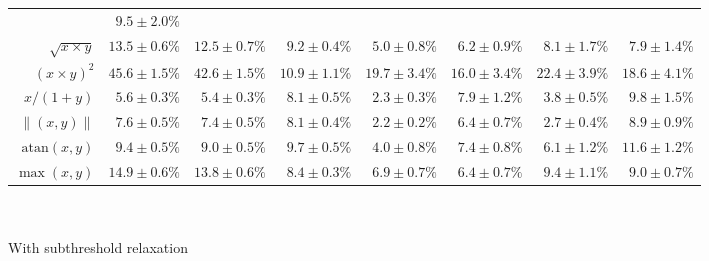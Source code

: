 \begin{table}[t]
\begin{tabular}{r r r r r r r r }
	& \cellcolor{White!58!SteelBlue}$9.5 \pm 2.0\%$
	\\
	$\sqrt{x \times y}$ 
	& \cellcolor{White!15!SteelBlue}$13.5 \pm 0.6\%$
	& \cellcolor{White!29!SteelBlue}$12.5 \pm 0.7\%$
	& \cellcolor{White!43!SteelBlue}$9.2 \pm 0.4\%$
	& \cellcolor{White!100!SteelBlue}$\mathbf{5.0 \pm 0.8\%}$
	& \cellcolor{White!86!SteelBlue}$6.2 \pm 0.9\%$
	& \cellcolor{White!58!SteelBlue}$8.1 \pm 1.7\%$
	& \cellcolor{White!72!SteelBlue}$7.9 \pm 1.4\%$
	\\
	$(x \times y) ^ 2$ 
	& \cellcolor{White!15!SteelBlue}$45.6 \pm 1.5\%$
	& \cellcolor{White!29!SteelBlue}$42.6 \pm 1.5\%$
	& \cellcolor{White!100!SteelBlue}$\mathbf{10.9 \pm 1.1\%}$
	& \cellcolor{White!58!SteelBlue}$19.7 \pm 3.4\%$
	& \cellcolor{White!86!SteelBlue}$16.0 \pm 3.4\%$
	& \cellcolor{White!43!SteelBlue}$22.4 \pm 3.9\%$
	& \cellcolor{White!72!SteelBlue}$18.6 \pm 4.1\%$
	\\
	$x / (1 + y)$ 
	& \cellcolor{White!58!SteelBlue}$5.6 \pm 0.3\%$
	& \cellcolor{White!72!SteelBlue}$5.4 \pm 0.3\%$
	& \cellcolor{White!29!SteelBlue}$8.1 \pm 0.5\%$
	& \cellcolor{White!100!SteelBlue}$\mathbf{2.3 \pm 0.3\%}$
	& \cellcolor{White!43!SteelBlue}$7.9 \pm 1.2\%$
	& \cellcolor{White!86!SteelBlue}$3.8 \pm 0.5\%$
	& \cellcolor{White!15!SteelBlue}$9.8 \pm 1.5\%$
	\\
	$\|(x, y)\|$ 
	& \cellcolor{White!43!SteelBlue}$7.6 \pm 0.5\%$
	& \cellcolor{White!58!SteelBlue}$7.4 \pm 0.5\%$
	& \cellcolor{White!29!SteelBlue}$8.1 \pm 0.4\%$
	& \cellcolor{White!100!SteelBlue}$\mathbf{2.2 \pm 0.2\%}$
	& \cellcolor{White!72!SteelBlue}$6.4 \pm 0.7\%$
	& \cellcolor{White!86!SteelBlue}$2.7 \pm 0.4\%$
	& \cellcolor{White!15!SteelBlue}$8.9 \pm 0.9\%$
	\\
	$\mathrm{atan}(x, y)$ 
	& \cellcolor{White!43!SteelBlue}$9.4 \pm 0.5\%$
	& \cellcolor{White!58!SteelBlue}$9.0 \pm 0.5\%$
	& \cellcolor{White!29!SteelBlue}$9.7 \pm 0.5\%$
	& \cellcolor{White!100!SteelBlue}$\mathbf{4.0 \pm 0.8\%}$
	& \cellcolor{White!72!SteelBlue}$7.4 \pm 0.8\%$
	& \cellcolor{White!86!SteelBlue}$6.1 \pm 1.2\%$
	& \cellcolor{White!15!SteelBlue}$11.6 \pm 1.2\%$
	\\
	$\max(x, y)$ 
	& \cellcolor{White!15!SteelBlue}$14.9 \pm 0.6\%$
	& \cellcolor{White!29!SteelBlue}$13.8 \pm 0.6\%$
	& \cellcolor{White!72!SteelBlue}$8.4 \pm 0.3\%$
	& \cellcolor{White!86!SteelBlue}$6.9 \pm 0.7\%$
	& \cellcolor{White!100!SteelBlue}$\mathbf{6.4 \pm 0.7\%}$
	& \cellcolor{White!43!SteelBlue}$9.4 \pm 1.1\%$
	& \cellcolor{White!58!SteelBlue}$9.0 \pm 0.7\%$
	\\
	\bottomrule
	\end{tabular}\\[0.125cm]
	\raggedright\textsuperscript{\dag}With subthreshold relaxation
	\label{tbl:function_approximations}
\end{table}

